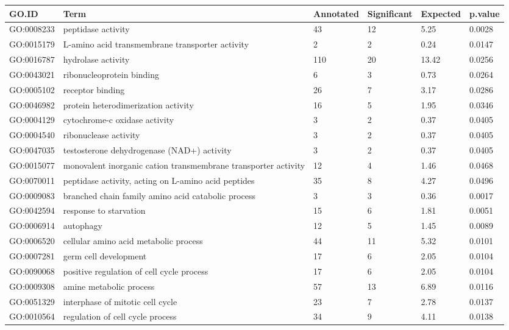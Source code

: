 \documentclass[10pt]{bmc_article}
\newenvironment{bmcformat}{\begin{raggedright}\baselineskip20pt\sloppy\setboolean{publ}{false}}{\end{raggedright}\baselineskip20pt\sloppy}
\begin{document}
\begin{bmcformat}
\begin{longtable}{lp{4.5cm}llll}
 GO.ID & Term & Annotated & Significant & Expected & p.value \\ 
  \hline
GO:0008233 & peptidase activity &  43 &  12 & 5.25 & 0.0028 \\ 
  GO:0015179 & L-amino acid transmembrane transporter activity &   2 &   2 & 0.24 & 0.0147 \\ 
  GO:0016787 & hydrolase activity & 110 &  20 & 13.42 & 0.0256 \\ 
   \hline
GO:0043021 & ribonucleoprotein binding &   6 &   3 & 0.73 & 0.0264 \\ 
  GO:0005102 & receptor binding &  26 &   7 & 3.17 & 0.0286 \\ 
  GO:0046982 & protein heterodimerization activity &  16 &   5 & 1.95 & 0.0346 \\ 
  GO:0004129 & cytochrome-c oxidase activity &   3 &   2 & 0.37 & 0.0405 \\ 
  GO:0004540 & ribonuclease activity &   3 &   2 & 0.37 & 0.0405 \\ 
  GO:0047035 & testosterone dehydrogenase (NAD+) activity &   3 &   2 & 0.37 & 0.0405 \\ 
  GO:0015077 & monovalent inorganic cation transmembrane transporter activity &  12 &   4 & 1.46 & 0.0468 \\ 
  GO:0070011 & peptidase activity, acting on L-amino acid peptides &  35 &   8 & 4.27 & 0.0496 \\ 
  GO:0009083 & branched chain family amino acid catabolic process &   3 &   3 & 0.36 & 0.0017 \\ 
  GO:0042594 & response to starvation &  15 &   6 & 1.81 & 0.0051 \\ 
  GO:0006914 & autophagy &  12 &   5 & 1.45 & 0.0089 \\ 
  GO:0006520 & cellular amino acid metabolic process &  44 &  11 & 5.32 & 0.0101 \\ 
  GO:0007281 & germ cell development &  17 &   6 & 2.05 & 0.0104 \\ 
  GO:0090068 & positive regulation of cell cycle process &  17 &   6 & 2.05 & 0.0104 \\ 
  GO:0009308 & amine metabolic process &  57 &  13 & 6.89 & 0.0116 \\ 
  GO:0051329 & interphase of mitotic cell cycle &  23 &   7 & 2.78 & 0.0137 \\ 
  GO:0010564 & regulation of cell cycle process &  34 &   9 & 4.11 & 0.0138 \\ 

\end{longtable}
\end{bmcformat}
\end{document}
